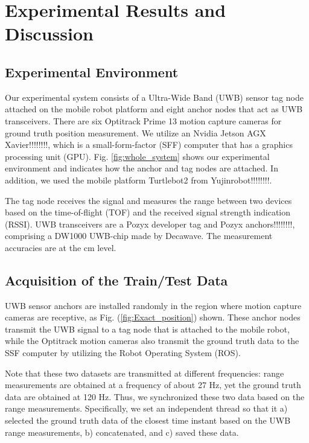 \documentclass[letterpaper, 10 pt, conference]{ieeeconf}
\begin{document}
\section{Experimental Results and Discussion}
\subsection{Experimental Environment}

Our experimental system consists of a Ultra-Wide Band (UWB)  sensor tag node attached on the mobile robot platform and eight anchor nodes that act as UWB transceivers. There are six Optitrack Prime 13 motion capture cameras for ground truth position measurement. We utilize an Nvidia Jetson AGX Xavier!!!!!!!!, which is a small-form-factor (SFF) computer that has a graphics processing unit (GPU). Fig. \ref{fig:whole_system} shows our experimental environment and indicates how the anchor and tag nodes are attached. In addition, we used the mobile platform Turtlebot2 from Yujinrobot!!!!!!!!.

The tag node receives the signal and measures the range between two devices based on the time-of-flight (TOF) and the received signal strength indication (RSSI). UWB transceivers are a Pozyx developer tag and Pozyx anchors!!!!!!!!, comprising a DW1000 UWB-chip made by Decawave. The measurement accuracies are at the cm level.
 
\subsection{Acquisition of the Train/Test Data}

UWB sensor anchors are installed randomly in the region where motion capture cameras are receptive, as Fig. (\ref{fig:Exact_position}) shown. These anchor nodes transmit the UWB signal to a tag node that is attached to the mobile robot, while the Optitrack motion cameras also transmit the ground truth data to the SSF computer by utilizing the Robot Operating System (ROS).

Note that these two datasets are transmitted at different frequencies: range measurements are obtained at a frequency of about 27 Hz, yet the ground truth data are obtained at 120 Hz. Thus, we synchronized these two data based on the range measurements. Specifically, we set an independent thread so that it a) selected the ground truth data of the closest time instant based on the UWB range measurements, b) concatenated, and c) saved these data.
\end{document}
